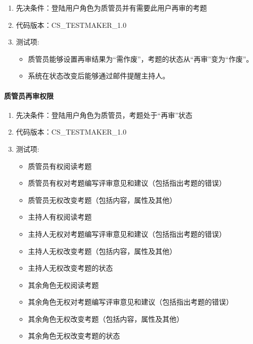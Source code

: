 \documentclass[hyperref, a4paper]{ctexart}
\providecommand{\tightlist}{%
  \setlength{\itemsep}{0pt}\setlength{\parskip}{0pt}}
\let\oldparagraph\paragraph
\renewcommand{\paragraph}[1]{\oldparagraph{#1}\mbox{}}
\begin{document}
\begin{enumerate}
\def\labelenumi{\arabic{enumi}.}
\tightlist
\item
  先决条件：登陆用户角色为质管员并有需要此用户再审的考题
\item
  代码版本：CS\_TESTMAKER\_1.0
\item
  测试项:

  \begin{itemize}
  \tightlist
  \item
    质管员能够设置再审结果为``需作废''，考题的状态从``再审''变为``作废''。
  \item
    系统在状态改变后能够通过邮件提醒主持人。
  \end{itemize}
\end{enumerate}

\hypertarget{ux8d28ux7ba1ux5458ux518dux5ba1ux6743ux9650}{%
\paragraph{质管员再审权限}\label{ux8d28ux7ba1ux5458ux518dux5ba1ux6743ux9650}}

\begin{enumerate}
\def\labelenumi{\arabic{enumi}.}
\tightlist
\item
  先决条件：登陆用户角色为质管员，考题处于``再审''状态
\item
  代码版本：CS\_TESTMAKER\_1.0
\item
  测试项:

  \begin{itemize}
  \tightlist
  \item
    质管员有权阅读考题
  \item
    质管员有权对考题编写评审意见和建议（包括指出考题的错误）
  \item
    质管员无权改变考题（包括内容，属性及其他）
  \item
    主持人有权阅读考题
  \item
    主持人无权对考题编写评审意见和建议（包括指出考题的错误）
  \item
    主持人无权改变考题（包括内容，属性及其他）
  \item
    主持人无权改变考题的状态
  \item
    其余角色无权阅读考题
  \item
    其余角色无权对考题编写评审意见和建议（包括指出考题的错误）
  \item
    其余角色无权改变考题（包括内容，属性及其他）
  \item
    其余角色无权改变考题的状态
  \end{itemize}
\end{enumerate}
\end{document}
